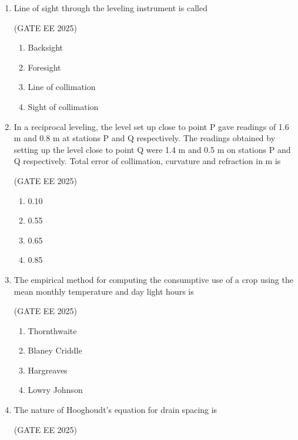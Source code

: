 \documentclass[journal,12pt,onecolumn]{IEEEtran}
\theoremstyle{remark}
\begin{document}
\begin{enumerate}
\item Line of sight through the leveling instrument is called 

\hfill(GATE EE 2025)

\begin{multicols}{4}
\begin{enumerate}
\item Backsight  
\item Foresight  
\item Line of collimation  
\item Sight of collimation  
\end{enumerate}
\end{multicols}

\item In a reciprocal leveling, the level set up close to point P gave readings of 1.6 m and 0.8 m at stations P and Q respectively. The readings obtained by setting up the level close to point Q were 1.4 m and 0.5 m on stations P and Q respectively. Total error of collimation, curvature and refraction in m is

\hfill(GATE EE 2025)

\begin{multicols}{4}
\begin{enumerate}
\item 0.10  
\item 0.55  
\item 0.65  
\item 0.85  
\end{enumerate}
\end{multicols}

\item The empirical method for computing the consumptive use of a crop using the mean monthly temperature and day light hours is

\hfill(GATE EE 2025)

\begin{multicols}{4}
\begin{enumerate}
\item Thornthwaite  
\item Blaney Criddle  
\item Hargreaves  
\item Lowry Johnson  
\end{enumerate}
\end{multicols}
\newpage
\item The nature of Hooghoudt's equation for drain spacing is 

\hfill(GATE EE 2025)


\end{enumerate}
\end{document}
